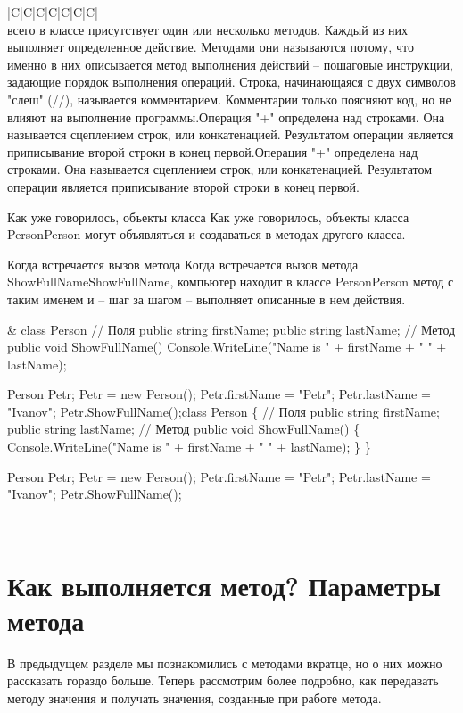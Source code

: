 \documentclass[12pt, a4paper]{article}
\begin{document}
\begin{table}[!ht] \setlength\extrarowheight{2pt} \begin{tabularx}{\textwidth}{|C|C|C|C|C|C|C|} \hline{}\\  всего в классе присутствует один или несколько методов. Каждый из них выполняет определенное действие. Методами они называются потому, что именно в них описывается метод выполнения действий – пошаговые инструкции, задающие порядок выполнения операций. Строка, начинающаяся с двух символов "слеш" (//), называется комментарием. Комментарии только поясняют код, но не влияют на выполнение программы.Операция "+" определена над строками. Она называется сцеплением строк, или конкатенацией. Результатом операции является приписывание второй строки в конец первой.Операция "+" определена над строками. Она называется сцеплением строк, или конкатенацией. Результатом операции является приписывание второй строки в конец первой.

Как уже говорилось, объекты класса Как уже говорилось, объекты класса PersonPerson  могут объявляться и создаваться в методах другого класса.

Когда встречается вызов метода Когда встречается вызов метода ShowFullNameShowFullName, компьютер находит в классе PersonPerson  метод с таким именем и – шаг за шагом – выполняет описанные в нем действия.

&
class Person
{
  // Поля
  public string firstName;
  public string lastName;
  // Метод
  public void ShowFullName()
  {
    Console.WriteLine("Name is " + firstName + " " + lastName);
  }
}

  Person Petr;
  Petr = new Person();
  Petr.firstName = "Petr";
  Petr.lastName = "Ivanov";
  Petr.ShowFullName();class Person
\{
  // Поля
  public string firstName;
  public string lastName;
  // Метод
  public void ShowFullName()
  \{
    Console.WriteLine("Name is " + firstName + " " + lastName);
  \}
\}

  Person Petr;
  Petr = new Person();
  Petr.firstName = "Petr";
  Petr.lastName = "Ivanov";
  Petr.ShowFullName();

\\ \hline\end{tabularx}         \end{table}


\section{Как выполняется метод? Параметры метода}
В предыдущем разделе мы познакомились с методами вкратце, но о них можно рассказать гораздо больше. Теперь рассмотрим более подробно, как передавать методу значения и получать значения, созданные при работе метода.\\
\end{document}
